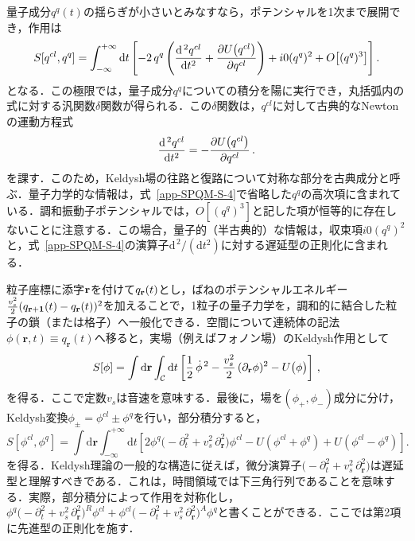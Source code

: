 \documentclass[a4paper,11pt]{ltjsarticle}
\def\d{\mathrm{d}}
\begin{document}
量子成分$q^{q}(t)$の揺らぎが小さいとみなすなら，ポテンシャルを1次まで展開でき，作用は
\begin{equation}\label{app-SPQM-S-4}
S[q^{cl},q^{q}]=\int_{-\infty}^{+\infty}\d
t\left[-2\,q^q\left({\d^{\,2} q^{cl}\over \d t^2} +{\partial
U\big(q^{cl}\big)\over \partial q^{cl} }\right) + i0 (q^{q})^{2}
+O\big[(q^q)^3\big]\right].
\end{equation}
となる．この極限では，量子成分$q^{q}$についての積分を陽に実行でき，丸括弧内の式に対する汎関数$\delta$関数が得られる．この$\delta$関数は，$q^{cl}$に対して古典的なNewtonの運動方程式
\begin{equation}\label{app-SPQM-Newton}
{\d^{\,2} q^{cl}\over \d t^2} =- {\partial U\big(q^{cl}\big)\over
\partial q^{cl} }\, .
\end{equation}
を課す．このため，Keldysh場の往路と復路について対称な部分を古典成分と呼ぶ．量子力学的な情報は，式~\eqref{app-SPQM-S-4}で省略した$q^{q}$の高次項に含まれている．調和振動子ポテンシャルでは，$O[(q^{q})^3]$と記した項が恒等的に存在しないことに注意する．この場合，量子的（半古典的）な情報は，収束項$i0(q^{q})^2$と，式~\eqref{app-SPQM-S-4}の演算子$\d^{\,2}/(\d t^2)$に対する遅延型の正則化に含まれる．

粒子座標に添字${\bf r}$を付けて$q_{\bf r}(t)$とし，ばねのポテンシャルエネルギー${v_s^2\over 2}(q_{{\bf r}+{\bf
1}}(t)-q_{\bf r}(t))^2$を加えることで，1粒子の量子力学を，調和的に結合した粒子の鎖（または格子）へ一般化できる．空間について連続体の記法$\phi(\mathbf{r},t)\equiv q_{\mathbf{r}}(t)$へ移ると，実場（例えばフォノン場）のKeldysh作用として
\begin{equation}\label{app-SPQM-S-Phonons}
S[\phi]= \int\d\mathbf{r}\int_{{\cal C}}\d t\left[ {1\over
2}\,\dot \phi^{\,2} - {v_s^2\over 2}\,(\partial_\mathbf{r}
\phi )^2 - U\big(\phi\big) \right]\, ,
\end{equation}
を得る．ここで定数$v_s$は音速を意味する．最後に，場を$(\phi_+,\phi_-)$成分に分け，Keldysh変換$\phi_\pm=\phi^{cl}\pm
\phi^q$を行い，部分積分すると，
\begin{equation}\label{app-SPQM-S-Phonons-1}
 S[\phi^{cl},\phi^{q}]= \int\d\mathbf{r}
\int_{-\infty}^{+\infty}\d t\left[ 2\phi^{q}\big( -\partial_t^2 +
v_s^2\,\partial_\mathbf{r}^2 \big) \phi^{cl}
-U(\phi^{cl}+\phi^{q})+U(\phi^{cl}-\phi^{q}) \right] .
\end{equation}
を得る．Keldysh理論の一般的な構造に従えば，微分演算子$\big(-\partial_t^2 +
v_s^2\,\partial_\mathbf{r}^2\big)$は遅延型と理解すべきである．これは，時間領域では下三角行列であることを意味する．実際，部分積分によって作用を対称化し，$\phi^{q}\big(-\partial_t^2 + v_s^2\,\partial_\mathbf{r}^2\big)^R
\phi^{cl}+ \phi^{cl}\big( -\partial_t^2 +
v_s^2\,\partial_\mathbf{r}^2\big)^A \phi^{q}$と書くことができる．ここでは第2項に先進型の正則化を施す．
\end{document}
